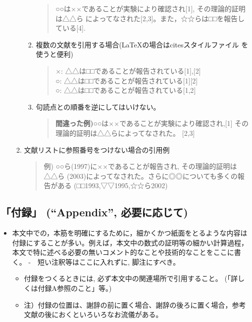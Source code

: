 \documentclass[12pt, ]{jsarticle}
\providecommand{\tightlist}{%
   \setlength{\itemsep}{0pt}\setlength{\parskip}{0pt}}
\begin{document}
\begin{enumerate}
\begin{enumerate}
\begin{enumerate}
      \begin{quote}
      ○○は××であることが実験により確認され{[}1{]}, その理論的証明は△△ら
      によってなされた{[}2,3{]}。また，☆☆らは□□を報告している{[}4{]}.
      \end{quote}
    \item
      複数の文献を引用する場合(LaTeXの場合はcitesスタイルファイル
      を使うと便利)

      \begin{quote}
      ×: △△は□□であることが報告されている{[}1{]},{[}2{]}\\
      ○: △△は□□であることが報告されている{[}1{]}{[}2{]}\\
      ○: △△は□□であることが報告されている{[}1,2{]}
      \end{quote}
    \item
      句読点との順番を逆にしてはいけない。

      \begin{quote}
      \textbf{間違った例)}○○は××であることが実験により確認され,{[}1{]}
      その理論的証明は△△らによってなされた。 {[}2,3{]}
      \end{quote}
    \end{enumerate}
  \item
    文献リストに参照番号をつけない場合の引用例

    \begin{quote}
    例) ○○ら(1997)に××であることが報告され, その理論的証明は△△ら
    (2003)によってなされた。さらに◎◎についても多くの報告がある
    (□□1993,▽▽1995,☆☆ら2002)
    \end{quote}
  \end{enumerate}
\end{enumerate}

\subsection{\texorpdfstring{「付録」 (``Appendix'',
必要に応じて)}{「付録」 (Appendix, 必要に応じて)}}\label{ux4ed8ux9332-appendix-ux5fc5ux8981ux306bux5fdcux3058ux3066}

\begin{itemize}
\tightlist
\item
  本文中での，本筋を明確にするために，細かくかつ紙面をとるような内容は付録にすることが多い。例えば，本文中の数式の証明等の細かい計算過程，本文で特に述べる必要の無いコメント的なことや技術的なことをここに書く。
  -　短い注釈等はここに入れずに, 脚注にすべき。

  \begin{itemize}
  \tightlist
  \item
    付録をつくるときには, 必ず本文中の関連場所で引用すること。
    (「詳しくは付録A参照のこと」等。)
  \item
    注）付録の位置は、謝辞の前に置く場合、謝辞の後ろに置く場合，参考文献の後におくといろいろなお流儀がある。
  \end{itemize}
\end{itemize}
\end{document}
